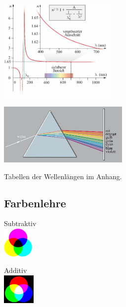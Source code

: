 \begin{center}
	\begin{minipage}{0.25\textwidth}
		\includegraphics[height=5cm,keepaspectratio=true]{Images/dispersion_graph.png}
	\end{minipage}%
	\begin{minipage}{0.3\textwidth}
		\includegraphics[height=3cm,keepaspectratio=true]{Images/dispersion_prisma.png}
	\end{minipage}
\end{center}

Tabellen der Wellenlängen im Anhang.

\subsection{Farbenlehre}

\begin{center}
	\begin{minipage}{0.2\textwidth}
		Subtraktiv \\
		\includegraphics[height=1.5cm,keepaspectratio=true]{Images/farbenkreise_subtraktiv.png}
	\end{minipage}%
	\begin{minipage}{0.2\textwidth}
		Additiv \\
		\includegraphics[height=1.5cm,keepaspectratio=true]{Images/farbenkreise_additiv.png}
	\end{minipage}
\end{center}


